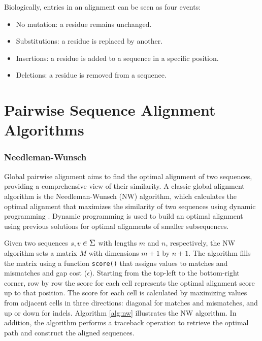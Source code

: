 Biologically, entries in an alignment can be seen as four events:
\begin{itemize}
    \item No mutation: a residue remains unchanged.
    \item Substitutions: a residue is replaced by another.
    \item Insertions: a residue is added to a sequence in a specific position.
    \item Deletions: a residue is removed from a sequence.
\end{itemize}


\section{Pairwise Sequence Alignment Algorithms}

\subsubsection{Needleman-Wunsch}

Global pairwise alignment aims to find the optimal alignment of two sequences, providing a comprehensive view of their similarity. A classic global alignment algorithm is the Needleman-Wunsch (NW) algorithm, which calculates the optimal alignment that maximizes the similarity of two sequences using dynamic programming \citep{Needleman1970}.
Dynamic programming is used to build an optimal alignment using previous solutions for optimal alignments of smaller subsequences.



Given two sequences $s, v \in \grande{\Sigma}$ with lengths $m$ and $n$, respectively, the NW algorithm sets a matrix $M$ with dimensions $m+1$ by $n+1$. The algorithm fills the matrix using a function \verb|score()| that assigns values to matches and mismatches and gap cost ($\epsilon$). Starting from the top-left to the bottom-right corner, row by row the score for each cell represents the optimal alignment score up to that position. The score for each cell is calculated by maximizing values from adjacent cells in three directions: diagonal for matches and mismatches, and up or down for indels. Algorithm \ref{alg:nw} illustrates the NW algorithm. In addition, the algorithm performs a traceback operation to retrieve the optimal path and construct the aligned sequences.

